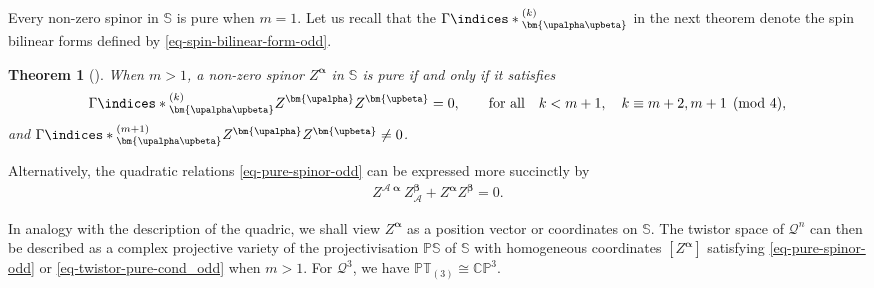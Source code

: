 \documentclass[pdftex]{sigma}
\numberwithin{equation}{section}
\newtheorem{Theorem}{Theorem}[section]
\newcommand{\mc} [1]{\mathcal{#1}}
\newcommand{\ind} {\indices}
\newcommand{\PT} {\mathbb{PT}}
\newcommand{\Ss} {\mathbb{S}}
\newcommand{\Pp} {\mathbb{P}}
\newcommand{\CP} {\mathbb{CP}}
\begin{document}
Every non-zero spinor in $\Ss$ is pure when $m=1$. Let us recall that the $\Gamma \ind*{^{(k)}_{\bm{\upalpha \upbeta}}}$ in the next theorem denote the spin bilinear forms def\/ined by \eqref{eq-spin-bilinear-form-odd}.
\begin{Theorem}[\cite{Cartan1981}]
When $m>1$, a non-zero spinor $Z^{\bm{\upalpha}}$ in $\Ss$ is pure if and only if it satisfies
\begin{gather}\label{eq-pure-spinor-odd}
\Gamma \ind*{^{(k)}_{\bm{\upalpha \upbeta}}} Z^{\bm{\upalpha}} Z^{\bm{\upbeta}} = 0 , \qquad \text{for all} \quad k < m+1 , \quad k \equiv m+2,m+1 \pmod{4},
\end{gather}
and $\Gamma \ind*{^{(m+1)}_{\bm{\upalpha \upbeta}}} Z^{\bm{\upalpha}} Z^{\bm{\upbeta}} \neq 0$.
\end{Theorem}
Alternatively, the quadratic relations \eqref{eq-pure-spinor-odd} can be expressed more succinctly by~\cite{Taghavi-Chabert2013}
\begin{gather}\label{eq-twistor-pure-cond_odd}
 Z^{\mc{A} \bm{\upalpha}} Z_\mc{A}^{\bm{\upbeta}} + Z^{\bm{\upalpha}} Z^{\bm{\upbeta}} = 0 .
\end{gather}

In analogy with the description of the quadric, we shall view $Z^{\bm{\upalpha}}$ as a position vector or coordinates on $\Ss$. The twistor space of $\mc{Q}^n$ can then be described as a complex projective variety of the projectivisation $\Pp \Ss$ of $\Ss$ with homogeneous coordinates $[Z^{\bm{\upalpha}}]$ satisfying \eqref{eq-pure-spinor-odd} or \eqref{eq-twistor-pure-cond_odd} when $m>1$. For $\mc{Q}^3$, we have $\PT_{(3)} \cong \CP^3$.
\end{document}
